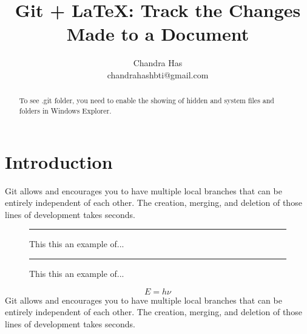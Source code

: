 \documentclass[a4paper,12pt]{article}
\title{Git + \LaTeX: Track the Changes Made to a Document}
\author{Chandra Has\\ \small chandrahashbti@gmail.com}\date{}
\begin{document}
\maketitle	

\begin{abstract}
To see .git folder, you need to enable the showing of hidden and system files and folders in Windows Explorer.
\end{abstract}

\section{Introduction}
Git allows and encourages you to have multiple local branches that can be entirely independent of each other. The creation, merging, and deletion of those lines of development takes seconds.

\begin{figure}[!h]\centering\rule{3cm}{3cm}
	\caption{This this an example of...}
\end{figure}

\begin{figure}[!h]\centering\rule{4cm}{4cm}
	\caption{This this an example of...}
\end{figure}

\begin{equation}E=h\nu\end{equation}
Git allows and encourages you to have multiple local branches that can be entirely independent of each other. The creation, merging, and deletion of those lines of development takes seconds.
\end{document}

